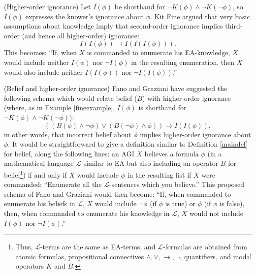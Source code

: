 \documentclass[runningheads]{llncs}
\begin{document}
\begin{example}
\label{fineexample}
  (Higher-order ignorance) Let $I(\phi)$ be shorthand for
  $\neg K(\phi)\wedge \neg K(\neg\phi)$, so $I(\phi)$ expresses the knower's
  ignorance about $\phi$. Kit Fine argued \cite{fine2018ignorance} that very
  basic assumptions
  about knowledge imply that second-order ignorance implies third-order (and hence
  all higher-order) ignorance:
  \[
    I(I(\phi)) \rightarrow I(I(I(\phi))).
  \]
  This becomes: ``If, when $X$ is commanded to enumerate his EA-knowledge,
  $X$ would include neither $I(\phi)$ nor $\neg I(\phi)$ in
  the resulting enumeration, then $X$ would also include neither $I(I(\phi))$
  nor $\neg I(I(\phi))$.''
\end{example}

\begin{example}
  (Belief and higher-order ignorance) Fano and Graziani have suggested \cite{fano} the
  following schema which would relate belief ($B$) with higher-order ignorance
  (where, as in Example \ref{fineexample}, $I(\phi)$ is shorthand for
  $\neg K(\phi)\wedge \neg K(\neg\phi)$):
  \[
    ((B(\phi) \wedge \neg\phi)\vee (B(\neg\phi)\wedge \phi)) \rightarrow I(I(\phi)),
  \]
  in other words, that incorrect belief about $\phi$ implies higher-order ignorance
  about $\phi$. It would be straightforward to give a definition similar to
  Definition \ref{maindef} for belief, along the following lines: an AGI $X$
  believes a formula $\phi$ (in a mathematical language $\mathscr L$ similar to EA but also
  including an operator $B$ for belief\footnote{Thus, $\mathscr L$-terms are the same
  as EA-terms, and $\mathscr L$-formulas are obtained from atomic formulas, propositional
  connectives $\wedge,\vee,\rightarrow,\neg$, quantifiers, and modal operators
  $K$ and $B$.})
  if and only if $X$ would include $\phi$ in the resulting list if $X$ were
  commanded:
  ``Enumerate all the $\mathscr L$-sentences which you believe.''
  This proposed schema of Fano and Graziani would then become:
  ``If, when commanded to enumerate his beliefs in $\mathscr L$,
  $X$ would include $\neg\phi$ (if $\phi$ is true) or $\phi$ (if $\phi$ is false),
  then, when commanded to enumerate his knowledge in $\mathscr L$,
  $X$ would not include $I(\phi)$ nor $\neg I(\phi)$.''
\end{example}
\end{document}
